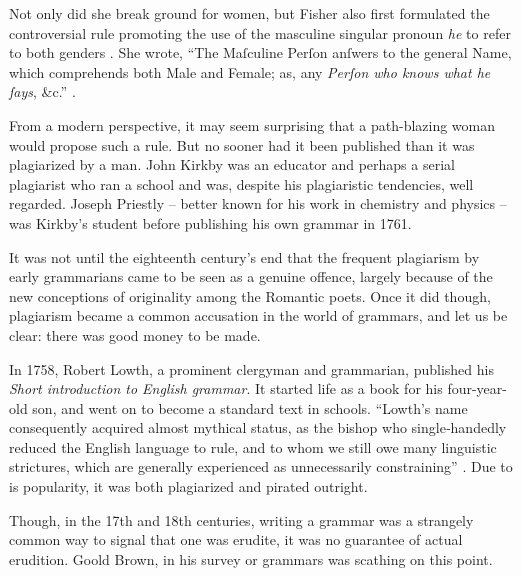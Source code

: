 Not only did she break ground for women, but Fisher also first formulated the controversial rule promoting the use of the masculine singular pronoun \textit{he} to refer to both genders \citep{Tieken-Boon}. She wrote, ``The Maſculine Perſon anſwers to the general Name, which comprehends both Male and Female; as, any \textit{Perſon who knows what he ſays}, \&c.'' \citep[106]{Fisher1785}.

From a modern perspective, it may seem surprising that a path-blazing woman would propose such a rule. But no sooner had it been published than it was plagiarized by a man. John Kirkby was an educator and perhaps a serial plagiarist who ran a school and was, despite his plagiaristic tendencies, well regarded. Joseph Priestly -- better known for his work in chemistry and physics -- was Kirkby's student before publishing his own grammar in 1761. 

It was not until the eighteenth century's end that the frequent plagiarism by early grammarians came to be seen as a genuine offence, largely because of the new conceptions of originality among the Romantic poets. Once it did though, plagiarism became a common accusation in the world of grammars, and let us be clear: there was good money to be made.

In 1758, Robert Lowth, a prominent clergyman and grammarian, published his \textit{Short introduction to English grammar}. It started life as a book for his four-year-old son, and went on to become a standard text in schools. ``Lowth's name consequently acquired almost mythical status, as the bishop who single‐handedly reduced the English language to rule, and to whom we still owe many linguistic strictures, which are generally experienced as unnecessarily constraining'' \citep[1]{Ostade2011a}. Due to is popularity, it was both plagiarized and pirated outright.

Though, in the 17th and 18th centuries, writing a grammar was a strangely common way to signal that one was erudite, it was no guarantee of actual erudition. Goold Brown, in his survey or grammars was scathing on this point.

